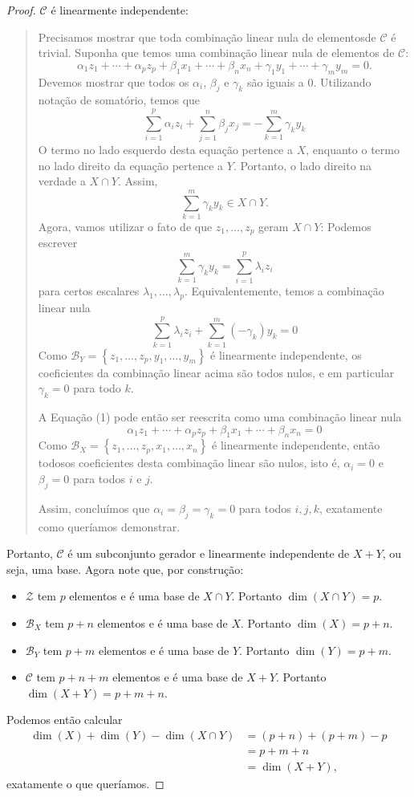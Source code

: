 \begin{proof}
	$\mathcal{C}$ é linearmente independente:
	\begin{quote}
		Precisamos mostrar que toda combinação linear nula de elementosde $\mathcal{C}$ é trivial. Suponha que temos uma combinação linear nula de elementos de $\mathcal{C}$:
		\[\alpha_1z_1+\cdots+\alpha_pz_p+\beta_1 x_1+\cdots+\beta_n x_n+\gamma_1 y_1+\cdots+\gamma_m y_m=0.\tag{1}\]
		Devemos mostrar que todos os $\alpha_i$, $\beta_j$ e $\gamma_k$ são iguais a $0$. Utilizando notação de somatório, temos que
		\[\sum_{i=1}^p\alpha_i z_i+\sum_{j=1}^n\beta_j x_j=-\sum_{k=1}^m\gamma_ky_k\]
		O termo no lado esquerdo desta equação pertence a $X$, enquanto o termo no lado direito da equação pertence a $Y$. Portanto, o lado direito na verdade a $X\cap Y$. Assim,
		\[\sum_{k=1}^m\gamma_k y_k\in X\cap Y.\]
		Agora, vamos utilizar o fato de que $z_1,\ldots,z_p$ geram $X\cap Y$: Podemos escrever
		\[\sum_{k=1}^m\gamma_ky_k=\sum_{i=1}^p\lambda_iz_i\]
		para certos escalares $\lambda_1,\ldots,\lambda_p$. Equivalentemente, temos a combinação linear nula
		\[\sum_{k=1}^p\lambda_iz_i+\sum_{k=1}^m(-\gamma_k)y_k=0\]
		Como $\mathcal{B}_Y=\left\{z_1,\ldots,z_p,y_1,\ldots,y_m\right\}$ é linearmente independente, os coeficientes da combinação linear acima são todos nulos, e em particular $\gamma_k=0$ para todo $k$.
		
		A Equação (1) pode então ser reescrita como uma combinação linear nula
		\[\alpha_1z_1+\cdots+\alpha_pz_p+\beta_1x_1+\cdots+\beta_nx_n=0\tag{2}\]
		Como $\mathcal{B}_X=\left\{z_1,\ldots,z_p,x_1,\ldots,x_n\right\}$ é linearmente independente, então todosos coeficientes desta combinação linear são nulos, isto é, $\alpha_i=0$ e $\beta_j=0$ para todos $i$ e $j$.
		
		Assim, concluímos que $\alpha_i=\beta_j=\gamma_k=0$ para todos $i,j,k$, exatamente como queríamos demonstrar.
	\end{quote}
	
	Portanto, $\mathcal{C}$ é um subconjunto gerador e linearmente independente de $X+Y$, ou seja, uma base. Agora note que, por construção:
	\begin{itemize}
		\item $\mathcal{Z}$ tem $p$ elementos e é uma base de $X\cap Y$. Portanto $\dim(X\cap Y)=p$.
		\item $\mathcal{B}_X$ tem $p+n$ elementos e é uma base de $X$. Portanto $\dim(X)=p+n$.
		\item $\mathcal{B}_Y$ tem $p+m$ elementos e é uma base de $Y$. Portanto $\dim(Y)=p+m$.
		\item $\mathcal{C}$ tem $p+n+m$ elementos e é uma base de $X+Y$. Portanto $\dim(X+Y)=p+m+n$.
	\end{itemize}
	
	Podemos então calcular
	\begin{align*}
		\dim(X)+\dim(Y)-\dim(X\cap Y)&=(p+n)+(p+m)-p\\
		&=p+m+n\\
		&=\dim(X+Y),
	\end{align*}
	exatamente o que queríamos.\qedhere
\end{proof}
